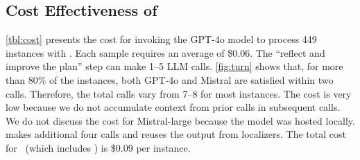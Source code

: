 \subsection{Cost Effectiveness of \solx}
\label{sec:rq4}

\cref{tbl:cost} presents the cost for invoking the GPT-4o model to process 449
instances with \solx. Each sample requires an average of \$0.06.
The ``reflect and improve the plan'' step can make 1--5 LLM
calls. \cref{fig:turn} shows that, for more than 80\% of the instances, both
GPT-4o and Mistral are satisfied within two calls. Therefore, the total calls
vary from 7--8 for most instances. The cost is very low because we do not
accumulate context from prior calls in subsequent calls.
We do not discuss the cost for Mistral-large because the model was
hosted locally.  \soly makes additional four calls and reuses the output from
localizers. The total cost for \soly~(which includes \solx) is \$0.09 per instance.



\begin{table}[t]
\centering
\caption{Cost for running \solx and \soly with GPT-4o.}
\vskip 0.05in
\label{tbl:cost}
\end{table}




